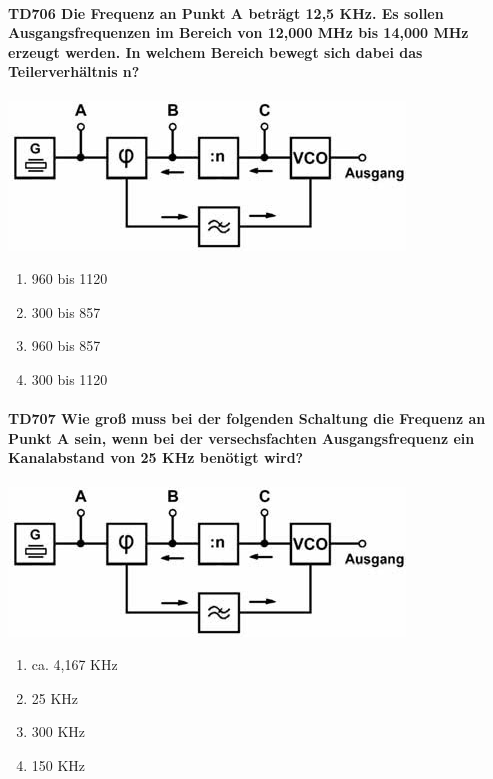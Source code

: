 \documentclass[8pt]{article}
\begin{document}
\begin{enumerate}
\begin{enumerate}[nolistsep,label=\Alph*]
\paragraph*{TD706 Die Frequenz an Punkt A beträgt 12,5 KHz. Es sollen Ausgangsfrequenzen im Bereich von 12,000 MHz bis 14,000 MHz erzeugt werden. In welchem Bereich bewegt sich dabei das Teilerverhältnis n?}
\begin{center}
	\begin{minipage}{\linewidth}
		\centering
		\includegraphics[scale=1.0]{pics/td706_a.jpg}
	\end{minipage}
\end{center}
\begin{enumerate}[nolistsep,label=\Alph*]
\item 960 bis 1120
\item 300 bis 857
\item 960 bis 857
\item 300 bis 1120
\end{enumerate}

\paragraph*{TD707 Wie groß muss bei der folgenden Schaltung die Frequenz an Punkt A sein, wenn bei der versechsfachten Ausgangsfrequenz ein Kanalabstand von 25 KHz benötigt wird?}
\begin{center}
	\begin{minipage}{\linewidth}
		\centering
		\includegraphics[scale=1.0]{pics/td707_a.jpg}
	\end{minipage}
\end{center}
\begin{enumerate}[nolistsep,label=\Alph*]
\item ca. 4,167 KHz
\item 25 KHz
\item 300 KHz
\item 150 KHz
\end{enumerate}


\end{enumerate}
\end{enumerate}
\end{document}
